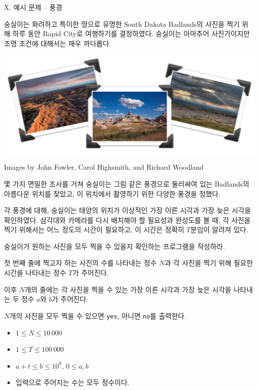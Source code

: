 \def\probtitle{예시 문제 -- 풍경}
\def\probno{X} %

\begin{problem}{\probno{}. \probtitle{}}

숭실이는 화려하고 특이한 땅으로 유명한 South Dakota Badlands의 사진을 찍기 위해 하루 동안 Rapid City로 여행하기를 결정하였다. 숭실이는 아마추어 사진가이지만 조명 조건에 대해서는 매우 까다롭다.

\begin{center}
    \includegraphics[width=0.5\linewidth]{image/scenery.png}
    
    Images by John Fowler, Carol Highsmith, and Richard Woodland
\end{center}

몇 가지 면밀한 조사를 거쳐 숭실이는 그림 같은 풍경으로 둘러싸여 있는 Badlands의 아름다운 위치를 찾았고, 이 위치에서 촬영하기 위한 다양한 풍경을 정했다.

각 풍경에 대해, 숭실이는 태양의 위치가 이상적인 가장 이른 시각과 가장 늦은 시각을 확인하였다. 삼각대와 카메라를 다시 배치해야 할 필요성과 완성도를 볼 때, 각 사진을 찍기 위해서는 어느 정도의 시간이 필요하고, 이 시간은 정확히 $T$분임이 알려져 있다.

숭실이가 원하는 사진을 모두 찍을 수 있을지 확인하는 프로그램을 작성하라.

\InputFile

첫 번째 줄에 찍고자 하는 사진의 수를 나타내는 정수 $N$과 각 사진을 찍기 위해 필요한 시간을 나타내는 정수 $T$가 주어진다.

이후 $N$개의 줄에는 각 사진을 찍을 수 있는 가장 이른 시각과 가장 늦은 시각을 나타내는 두 정수 $a$와 $b$가 주어진다.

\OutputFile

$N$개의 사진을 모두 찍을 수 있으면 \texttt{yes}, 아니면 \texttt{no}를 출력한다.

\Constraints

\begin{itemize}[topsep=0pt,noitemsep]
    \item $1 \le N \le 10\,000$
    \item $1 \le T \le 100\,000$
    \item $a+t \le b \le 10^9$, $0 \le a, b$
    \item 입력으로 주어지는 수는 모두 정수이다.
\end{itemize}


\end{problem}
